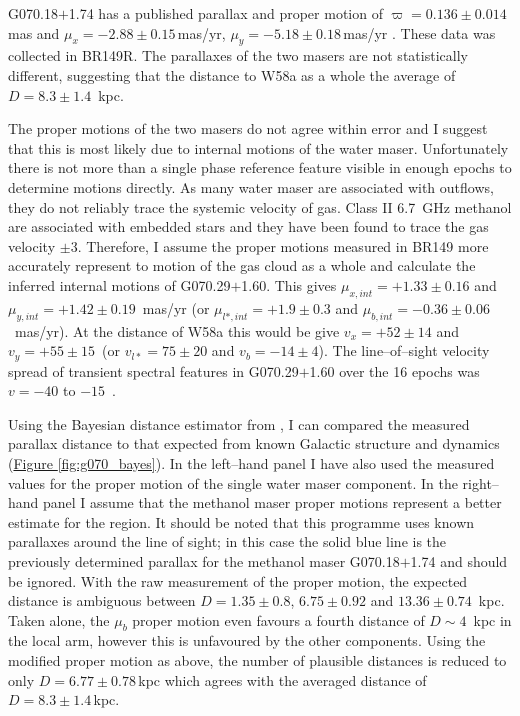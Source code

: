             G070.18$+$1.74 has a published parallax and proper motion of $\varpi=0.136\pm0.014$\,mas and $\mu_x=-2.88\pm0.15$\,mas/yr, $\mu_y=-5.18\pm0.18$\,mas/yr \citep[giving $\mu_{l*}=-5.92\pm0.15$ and $\mu_b=-0.33\pm0.08$~mas/yr; ][]{Zhang2019}. These data was collected in BR149R. The parallaxes of the two masers are not statistically different, suggesting that the distance to W58a as a whole the average of $D=8.3\pm1.4$~kpc. %
            
            The proper motions of the two masers do not agree within error and I suggest that this is most likely due to internal motions of the water maser. Unfortunately there is not more than a single phase reference feature visible in enough epochs to determine motions directly. As many water maser are associated with outflows, they do not reliably trace the systemic velocity of gas. Class II 6.7~GHz methanol are associated with embedded stars and they have been found to trace the gas velocity $\pm3$\kms \citep{Green2011b}. Therefore, I assume the proper motions measured in BR149 more accurately represent to motion of the gas cloud as a whole and calculate the inferred internal motions of G070.29$+$1.60. This gives $\mu_{x,int}=+1.33\pm0.16$ and $\mu_{y,int}=+1.42\pm0.19$~mas/yr (or $\mu_{l*,int}=+1.9\pm0.3$ and $\mu_{b,int}=-0.36\pm0.06$~mas/yr). At the distance of W58a this would be give $v_x =+52\pm14$ and $v_y=+55\pm15$~\kms (or $v_{l*}=75\pm20$ and $v_b=-14\pm4$). The line--of--sight velocity spread of transient spectral features in G070.29$+$1.60 over the 16 epochs was $v=-40$ to $-15$~\kms.

			Using the Bayesian distance estimator from \citet{Reid2014,Reid2019}, I can compared the measured parallax distance to that expected from known Galactic structure and dynamics (\hyperref[fig:g070_bayes]{Figure \ref*{fig:g070_bayes}}). In the left--hand panel I have also used the measured values for the proper motion of the single water maser component. In the right--hand panel I assume that the methanol maser proper motions represent a better estimate for the region. It should be noted that this programme uses known parallaxes around the line of sight; in this case the solid blue line is the previously determined parallax for the methanol maser G070.18$+$1.74 and should be ignored. With the raw measurement of the proper motion, the expected distance is ambiguous between $D=1.35\pm0.8$, $6.75\pm0.92$ and $13.36\pm0.74$~kpc. Taken alone, the $\mu_b$ proper motion even favours a fourth distance of $D\sim4$~kpc in the local arm, however this is unfavoured by the other components. Using the modified proper motion as above, the number of plausible distances is reduced to only $D=6.77\pm0.78$\,kpc which agrees with the averaged distance of $D=8.3\pm1.4$\,kpc.
            
